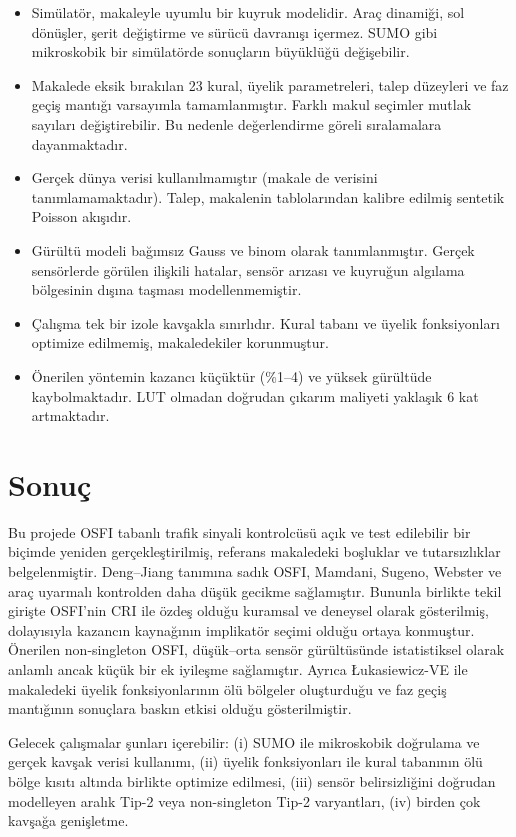 \documentclass[11pt,a4paper]{article}
\theoremstyle{definition}
\begin{document}
\begin{itemize}
\item Simülatör, makaleyle uyumlu bir kuyruk modelidir. Araç dinamiği, sol dönüşler, şerit değiştirme ve sürücü davranışı içermez. SUMO gibi mikroskobik bir simülatörde sonuçların büyüklüğü değişebilir.
\item Makalede eksik bırakılan 23 kural, üyelik parametreleri, talep düzeyleri ve faz geçiş mantığı varsayımla tamamlanmıştır. Farklı makul seçimler mutlak sayıları değiştirebilir. Bu nedenle değerlendirme göreli sıralamalara dayanmaktadır.
\item Gerçek dünya verisi kullanılmamıştır (makale de verisini tanımlamamaktadır). Talep, makalenin tablolarından kalibre edilmiş sentetik Poisson akışıdır.
\item Gürültü modeli bağımsız Gauss ve binom olarak tanımlanmıştır. Gerçek sensörlerde görülen ilişkili hatalar, sensör arızası ve kuyruğun algılama bölgesinin dışına taşması modellenmemiştir.
\item Çalışma tek bir izole kavşakla sınırlıdır. Kural tabanı ve üyelik fonksiyonları optimize edilmemiş, makaledekiler korunmuştur.
\item Önerilen yöntemin kazancı küçüktür (\%1--4) ve yüksek gürültüde kaybolmaktadır. LUT olmadan doğrudan çıkarım maliyeti yaklaşık 6 kat artmaktadır.
\end{itemize}

\section{Sonuç}
\label{sec:conclusion}

Bu projede OSFI tabanlı trafik sinyali kontrolcüsü açık ve test edilebilir bir biçimde yeniden gerçekleştirilmiş, referans makaledeki boşluklar ve tutarsızlıklar belgelenmiştir. Deng--Jiang tanımına sadık OSFI, Mamdani, Sugeno, Webster ve araç uyarmalı kontrolden daha düşük gecikme sağlamıştır. Bununla birlikte tekil girişte OSFI'nin CRI ile özdeş olduğu kuramsal ve deneysel olarak gösterilmiş, dolayısıyla kazancın kaynağının implikatör seçimi olduğu ortaya konmuştur. Önerilen non-singleton OSFI, düşük--orta sensör gürültüsünde istatistiksel olarak anlamlı ancak küçük bir ek iyileşme sağlamıştır. Ayrıca Łukasiewicz-VE ile makaledeki üyelik fonksiyonlarının ölü bölgeler oluşturduğu ve faz geçiş mantığının sonuçlara baskın etkisi olduğu gösterilmiştir.

Gelecek çalışmalar şunları içerebilir: (i) SUMO ile mikroskobik doğrulama ve gerçek kavşak verisi kullanımı, (ii) üyelik fonksiyonları ile kural tabanının ölü bölge kısıtı altında birlikte optimize edilmesi, (iii) sensör belirsizliğini doğrudan modelleyen aralık Tip-2 veya non-singleton Tip-2 varyantları, (iv) birden çok kavşağa genişletme.
\end{document}
